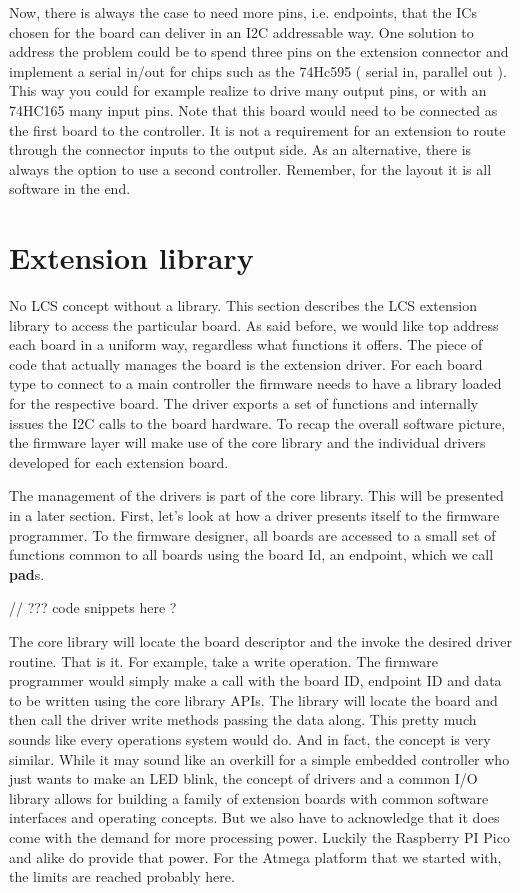 Now, there is always the case to need more pins, i.e. endpoints, that the ICs chosen for the board can deliver in an I2C addressable way. One solution to address the problem could be to spend three pins on the extension connector and implement a serial in/out for chips such as the 74Hc595 ( serial in, parallel out ). This way you could for example realize to drive many output pins, or with an 74HC165 many input pins. Note that this board would need to be connected as the first board to the controller. It is not a requirement for an extension to route through the connector inputs to the output side. As an alternative, there is always the option to use a second controller. Remember, for the layout it is all software in the end.

\section{Extension library}

No LCS concept without a library. This section describes the LCS extension library to access the particular board. As said before, we would like top address each board in a uniform way, regardless what functions it offers. The piece of code that actually manages the board is the extension driver. For each board type to connect to a main controller the firmware needs to have a library loaded for the respective board. The driver exports a set of functions and internally issues the I2C calls to the board hardware. To recap the overall software picture, the firmware layer will make use of the core library and the individual drivers developed for each extension board.

The management of the drivers is part of the core library. This will be presented in a later section. First, let's look at how a driver presents itself to the firmware programmer. To the firmware designer, all boards are accessed to a small set of functions common to all boards using the board Id, an endpoint, which we call \textbf{pad}s.

// ??? code snippets here ?

The core library will locate the board descriptor and the invoke the desired driver routine. That is it. For example, take a write operation. The firmware programmer would simply make a call with the board ID, endpoint ID and data to be written using the core library APIs. The library will locate the board and then call the driver write methods passing the data along. This pretty much sounds like every operations system would do. And in fact, the concept is very similar. While it may sound like an overkill for a simple embedded controller who just wants to make an LED blink, the concept of drivers and a common I/O library allows for building a family of extension boards with common software interfaces and operating concepts. But we also have to acknowledge that it does come with the demand for more processing power. Luckily the Raspberry PI Pico and alike do provide that power. For the Atmega platform that we started with, the limits are reached probably here.


